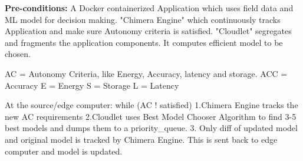 \textbf{Pre-conditions:} A Docker containerized Application which uses field data and ML model for decision making. "Chimera Engine" which continuously tracks Application and make sure Autonomy criteria is satisfied. "Cloudlet" segregates and fragments the application components. It computes efficient model to be chosen.

AC = Autonomy Criteria, like Energy, Accuracy, latency and storage.
ACC = Accuracy
E = Energy
S = Storage
L = Latency

At the source/edge computer: while (AC ! satisfied)
{
1.Chimera Engine tracks the new AC requirements
2.Cloudlet uses Best Model Chooser Algorithm to find 3-5 best models and dumps them to a priority\_queue.
3. Only diff of updated model and original model is tracked by Chimera Engine. This is sent back to edge computer and model is updated.
}